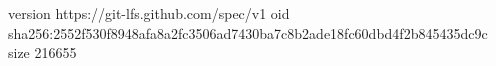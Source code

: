 version https://git-lfs.github.com/spec/v1
oid sha256:2552f530f8948afa8a2fc3506ad7430ba7c8b2ade18fc60dbd4f2b845435dc9c
size 216655
